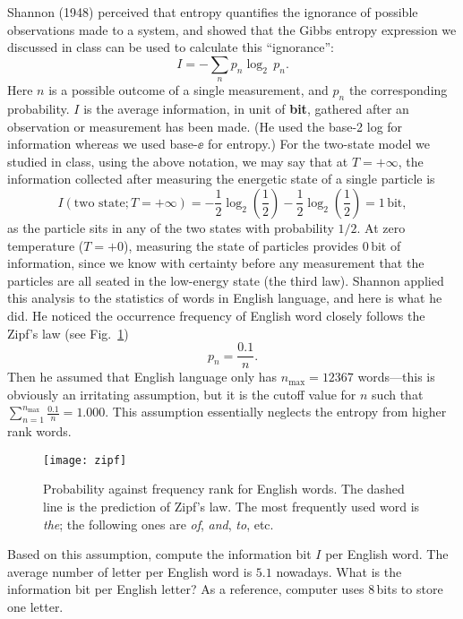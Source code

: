 \bigskip
{}
Shannon (1948) perceived that entropy quantifies the ignorance of possible observations
made to a system, and
showed that the Gibbs entropy expression we discussed in class can be used to
calculate this ``ignorance'':
$$ I = - \sum_n p_n \log_2\, p_n .$$
Here $n$ is a possible outcome of a single measurement,
and $p_n$ the corresponding probability.
$I$ is the average information, in unit of {\bf bit},
gathered after an observation or measurement has been made.
(He used the base-2 log for information whereas we used base-$\ee$ for entropy.)
For the two-state model we studied in class,
using the above notation, we may say that at $T = +\infty$,
the information collected after measuring the energetic state of a single particle is
$$I(\text{two state}; T=+\infty) = -\frac{1}{2}\log_2\left(\frac{1}{2}\right)
- \frac{1}{2}\log_2\left(\frac{1}{2}\right) = 1 \,\text{bit},$$
as the particle sits in any of the two states with probability $1/2$.
At zero temperature ($T=+0$), measuring the state of particles provides 0\,bit of information,
since we know with certainty before any measurement that the
particles are all seated in the low-energy state (the third law).
Shannon applied this analysis to the statistics of words in English language,
and here is what he did.
He noticed the occurrence frequency of English word closely follows the Zipf's law
(see Fig.~\ref{fig:zipf})
$$ p_n = \frac{0.1}{n} .$$
Then he assumed that English language only has $n_\text{max} = 12367$ words---this is obviously an irritating assumption, but it is the cutoff value for $n$ such that
$\sum_{n=1}^{n_\text{max}} \frac{0.1}{n} = 1.000$.
This assumption essentially neglects the entropy from higher rank words.
\begin{figure}[h]\centering
\texttt{[image: zipf]}
\caption{\label{fig:zipf}
Probability against frequency rank for English words.
The dashed line is the prediction of Zipf's law.
The most frequently used word is {\sl the};
the following ones are {\sl of}, {\sl and}, {\sl to}, etc.
}
\end{figure}

\noindent
Based on this assumption, compute the information bit $I$ per English word.
The average number of letter per English word is $5.1$ nowadays.
What is the information bit per English letter?
As a reference,
computer uses 8\,bits to store one letter.

